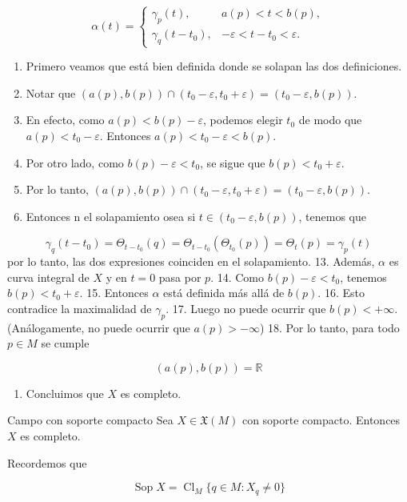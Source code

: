 \begin{bookproof}{}
\[
\alpha(t)=\begin{cases}\gamma_p(t),&a(p)<t<b(p),\\\gamma_q(t-t_0),&-\varepsilon<t-t_0<\varepsilon.\end{cases}
\]
\begin{enumerate}[start=7]
\item Primero veamos que está bien definida donde se solapan las dos definiciones.
\item Notar que $(a(p),b(p))\cap(t_0-\varepsilon,t_0+\varepsilon)=(t_0-\varepsilon,b(p))$.
\item En efecto, como $a(p)<b(p)-\varepsilon$, podemos elegir $t_0$ de modo que $a(p)<t_0-\varepsilon$. Entonces $a(p)<t_0-\varepsilon<b(p)$.
\item Por otro lado, como $b(p)-\varepsilon<t_0$, se sigue que $b(p)<t_0+\varepsilon$.
\item Por lo tanto, $(a(p),b(p))\cap(t_0-\varepsilon,t_0+\varepsilon)=(t_0-\varepsilon,b(p))$.
\item Entonces n el solapamiento osea si $t\in(t_0-\varepsilon,b(p))$, tenemos que
\end{enumerate}
\[
\gamma_q(t-t_0)=\Theta_{t-t_0}(q)=\Theta_{t-t_0}(\Theta_{t_0}(p))=\Theta_t(p)=\gamma_p(t)
\]
por lo tanto, las dos expresiones coinciden en el solapamiento. 13. Además, $\alpha$ es curva integral de $X$ y en $t=0$ pasa por $p$. 14. Como $b(p)-\varepsilon<t_0$, tenemos $b(p)<t_0+\varepsilon$. 15. Entonces $\alpha$ está definida más allá de $b(p)$. 16. Esto contradice la maximalidad de $\gamma_p$. 17. Luego no puede ocurrir que $b(p)<+\infty$. (Análogamente, no puede ocurrir que $a(p)>-\infty$) 18. Por lo tanto, para todo $p\in M$ se cumple

\[
(a(p),b(p))=\mathbb R
\]
\begin{enumerate}[start=19]
\item Concluimos que $X$ es completo.
\end{enumerate}
\bookqed
\end{bookproof}
\begin{booktheorem}{Campo con soporte compacto}
Sea $X\in\mathfrak X(M)$ con soporte compacto. Entonces $X$ es completo.

Recordemos que

\[
\operatorname{Sop}X=\operatorname{Cl}_M\{q\in M:X_q\neq0\}
\]
\end{booktheorem}
